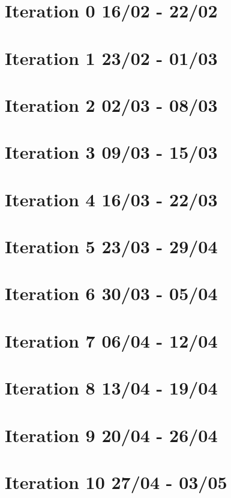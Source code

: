 \section{Iteration 0 16/02 - 22/02}


\section{Iteration 1 23/02 - 01/03}



\section{Iteration 2 02/03 - 08/03}



\section{Iteration 3 09/03 - 15/03}



\section{Iteration 4 16/03 - 22/03}



\section{Iteration 5 23/03 - 29/04}



\section{Iteration 6 30/03 - 05/04}



\section{Iteration 7 06/04 - 12/04}



\section{Iteration 8 13/04 - 19/04}



\section{Iteration 9 20/04 - 26/04}



\section{Iteration 10 27/04 - 03/05}

